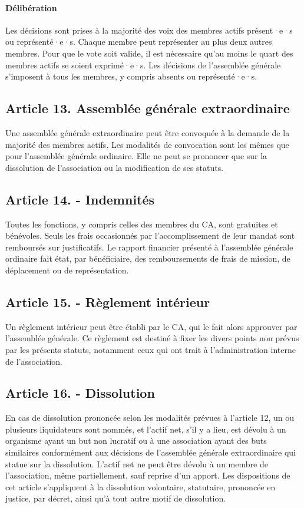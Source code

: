 \documentclass[a4paper]{article}
\begin{document}
\paragraph{Délibération}
Les décisions sont prises à la majorité des voix des membres actifs présent·e·s ou représenté·e·s. Chaque
membre peut représenter au plus deux autres membres.
Pour que le vote soit valide, il est nécessaire qu'au moins le quart des membres actifs se soient exprimé·e·s.
Les décisions de l'assemblée générale s'imposent à tous les membres, y compris absents ou
représenté·e·s.

\subsection*{Article 13. Assemblée générale extraordinaire}

Une assemblée générale extraordinaire peut être convoquée à la demande de la majorité
des membres actifs.
Les modalités de convocation sont les mêmes que pour l'assemblée générale ordinaire.
Elle ne peut se prononcer que sur la
dissolution de l'association ou la modification de ses statuts.

\subsection*{Article 14. - Indemnités}

Toutes les fonctions, y compris celles des membres du CA, sont gratuites et
bénévoles. Seuls les frais occasionnés par l'accomplissement de leur mandat sont
remboursés sur justificatifs. Le rapport financier présenté à l'assemblée générale
ordinaire fait état, par bénéficiaire, des remboursements de frais de mission,
de déplacement ou de représentation.

\subsection*{Article 15. - Règlement intérieur}

Un règlement intérieur peut être établi par le CA, qui le fait alors
approuver par l'assemblée générale.
Ce règlement est destiné à fixer les divers points non prévus par les présents statuts,
notamment ceux qui ont trait à l'administration interne de l'association.

\subsection*{Article 16. - Dissolution}

En cas de dissolution prononcée selon les modalités prévues à l’article 12, un
ou plusieurs liquidateurs sont nommés, et l’actif net, s’il y a lieu, est
dévolu à un organisme ayant un but non lucratif ou à une association ayant des
buts similaires conformément aux décisions de l’assemblée générale
extraordinaire qui statue sur la dissolution. L’actif net ne peut être dévolu à
un membre de l’association, même partiellement, sauf reprise d’un apport. Les
dispositions de cet article s’appliquent à la dissolution volontaire,
statutaire, prononcée en justice, par décret, ainsi qu’à tout autre motif de
dissolution.
\end{document}
